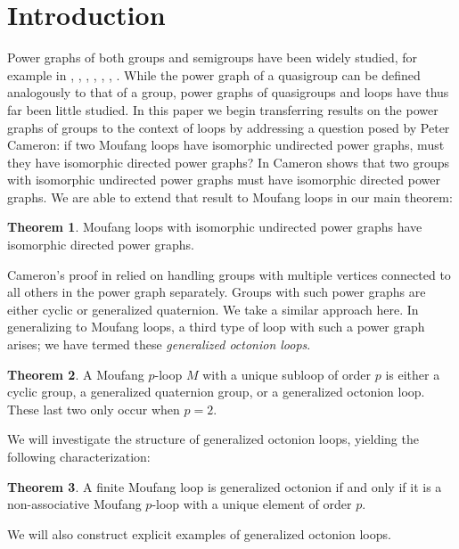 \documentclass[12pt]{report}
\theoremstyle{definition}
\newtheorem{thm}{Theorem}[chapter]
\begin{document}
\section{Introduction}

Power graphs of both groups and semigroups have been widely studied, for example in \cite{EPG}, \cite{PG},
  \cite{PGII}, \cite{Tor}, \cite{Feng}, \cite{Mog}, \cite{Panda}. While the power graph of a quasigroup
  can be defined analogously to that of a group, power graphs of quasigroups and loops have thus far been
  little studied. In this paper we begin transferring results on the power graphs of groups to the context
  of loops by addressing a question posed by Peter Cameron: if two Moufang loops have isomorphic undirected
  power graphs, must they have isomorphic directed power graphs? In \cite{PGII} Cameron shows that two groups
  with isomorphic undirected power graphs must have isomorphic directed power graphs. We are able to extend
  that result to Moufang loops in our main theorem:

\begin{thm}\label{mainThm}
  Moufang loops with isomorphic undirected power graphs have isomorphic directed power graphs.
\end{thm}

Cameron's proof in \cite{PGII} relied on handling groups with multiple vertices connected to all others in
  the power graph separately. Groups with such power graphs are either cyclic or generalized quaternion. We
  take a similar approach here. In generalizing to Moufang loops, a third type of loop with such a power graph
  arises; we have termed these \textit{generalized octonion loops}. 

\begin{thm}\label{moufangDesc}
  A Moufang $p$-loop $M$ with a unique subloop of order $p$ is either a cyclic group, a generalized quaternion
    group, or a generalized octonion loop. These last two only occur when $p = 2$.
\end{thm}

We will investigate the structure of generalized octonion loops, yielding the following characterization:

\begin{thm}\label{genOct}
  A finite Moufang loop is generalized octonion if and only if it is a non-associative Moufang $p$-loop
    with a unique element of order $p$.
\end{thm}

We will also construct explicit examples of generalized octonion loops.
\end{document}
